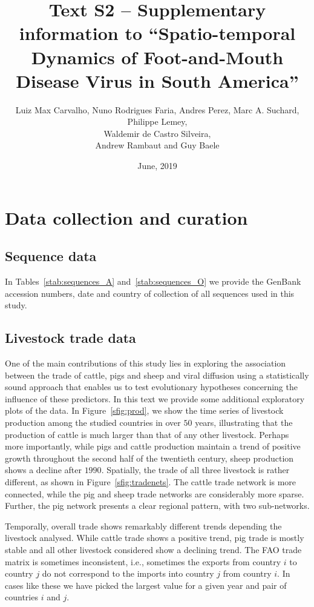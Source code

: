 \documentclass[a4paper,10pt]{article}
\title{Text S2 -- Supplementary information to ``Spatio-temporal Dynamics of Foot-and-Mouth Disease Virus in South America''}
\author{
Luiz Max Carvalho, Nuno Rodrigues Faria, Andres Perez,
Marc A. Suchard, Philippe Lemey,\\
Waldemir de Castro Silveira,\\
Andrew Rambaut and Guy Baele
}
\date{June, 2019}
\begin{document}
\maketitle

\section*{Data collection and curation}

\subsection*{Sequence data}

In Tables~\ref{stab:sequences_A} and~\ref{stab:sequences_O} we provide the GenBank accession numbers, date and country of collection of all sequences used in this study.

\subsection*{Livestock trade data}

One of the main contributions of this study lies in exploring the association between the trade of cattle, pigs and sheep and viral diffusion using a statistically sound approach that enables us to test evolutionary hypotheses concerning the influence of these predictors.
In this text we provide some additional exploratory plots of the data.
In Figure~\ref{sfig:prod}, we show the time series of livestock production among the studied countries in over $50$ years, illustrating that the production of cattle is much larger than that of any other livestock.
Perhaps more importantly, while pigs and cattle production maintain a trend of positive growth throughout the second half of the twentieth century, sheep production shows a decline after $1990$.
Spatially, the trade of all three livestock is rather different, as shown in Figure~\ref{sfig:tradenets}.
The cattle trade network is more connected, while the pig and sheep trade networks are considerably more sparse.
Further, the pig network presents a clear regional pattern, with two sub-networks.

Temporally, overall trade shows remarkably different trends depending the livestock analysed.
While cattle trade shows a positive trend, pig trade is mostly  stable and all other livestock considered show a declining trend.
The FAO trade matrix is sometimes inconsistent, i.e., sometimes the exports from country $i$ to country $j$ do not correspond to the imports into country $j$ from country $i$.
In cases like these we have picked the largest value for a given year and pair of countries $i$ and $j$.
\end{document}
